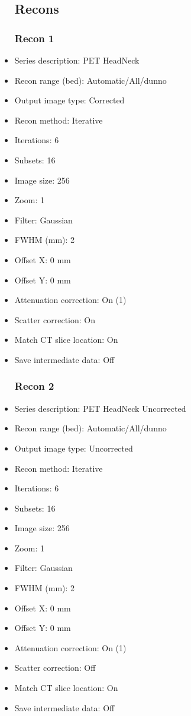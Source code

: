 \documentclass[12pt]{article}
\begin{document}
\begin{itemize}
\subsection{Recons}
\subsubsection{Recon 1}
\item Series description: PET HeadNeck
\item Recon range (bed): Automatic/All/dunno
\item Output image type: Corrected
\item Recon method: Iterative
\item Iterations: 6
\item Subsets: 16
\item Image size: 256
\item Zoom: 1
\item Filter: Gaussian
\item FWHM (mm): 2
\item Offset X: 0 mm
\item Offset Y: 0 mm
\item Attenuation correction: On (1)
\item Scatter correction: On
\item Match CT slice location: On
\item Save intermediate data: Off
\subsubsection{Recon 2}
\item Series description: PET HeadNeck Uncorrected
\item Recon range (bed): Automatic/All/dunno
\item Output image type: Uncorrected
\item Recon method: Iterative
\item Iterations: 6
\item Subsets: 16
\item Image size: 256
\item Zoom: 1
\item Filter: Gaussian
\item FWHM (mm): 2
\item Offset X: 0 mm
\item Offset Y: 0 mm
\item Attenuation correction: On (1)
\item Scatter correction: Off
\item Match CT slice location: On
\item Save intermediate data: Off
\end{itemize}
\end{document}

